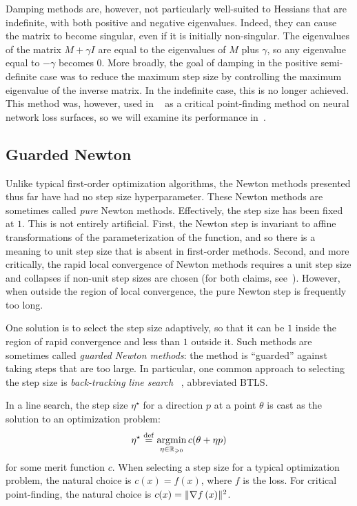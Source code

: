 \documentclass[../../thesis.tex]{subfiles}
\begin{document}
Damping methods are, however,
not particularly well-suited to Hessians that are indefinite,
with both positive and negative eigenvalues.
Indeed, they can cause the matrix to become singular,
even if it is initially non-singular.
The eigenvalues of the matrix $M + \gamma I$
are equal to the eigenvalues of $M$ plus $\gamma$,
so any eigenvalue equal to $-\gamma$ becomes $0$.
More broadly,
the goal of damping in the positive semi-definite case
was to reduce the maximum step size by controlling
the maximum eigenvalue of the inverse matrix.
In the indefinite case, this is no longer achieved.
This method was, however, used in%
~\cite{dauphin2014}
as a critical point-finding method
on neural network loss surfaces,
so we will examine its performance in~.

\subsection{Guarded Newton}

Unlike typical first-order optimization algorithms,
the Newton methods presented thus far have had no step size hyperparameter.
These Newton methods are sometimes called \emph{pure} Newton methods.
Effectively, the step size has been fixed at $1$.
This is not entirely artificial.
First, the Newton step is invariant to affine transformations
of the parameterization of the function,
and so there is a meaning to unit step size
that is absent in first-order methods.
Second, and more critically,
the rapid local convergence of Newton methods
requires a unit step size
and collapses if non-unit step sizes are chosen
(for both claims, see~\cite{boyd2004,nocedal2006,roosta2018}).
However, when outside the region
of local convergence,
the pure Newton step is frequently too long.

One solution is to select the step size adaptively,
so that it can be $1$ inside the region of rapid convergence
and less than $1$ outside it.
Such methods are sometimes called \emph{guarded Newton methods}:
the method is \enquote{guarded} against taking steps that are too large.
In particular, one common approach to selecting the step size
is \emph{back-tracking line search}%
~\cite{armijo1966},
abbreviated BTLS.\@

In a line search, the step size $\eta^\star{}$
for a direction $p$ at a point $\theta$
is cast as the solution to an optimization problem:
\begin{equation}
	\eta^\star{}
	\stackrel{\small \mathrm{def}}{=} \mathop{\mathrm{argmin}}_{\eta \in \mathbb{R}_{\geqslant 0}} c(\theta + \eta p)
\end{equation}
\noindent for some merit function $c$.
When selecting a step size for a typical optimization problem,
the natural choice is $c(x) = f(x)$, where $f$ is the loss.
For critical point-finding,
the natural choice is $c(x) = \lVert\nabla f\left(x\right)\rVert^2$.
\end{document}
